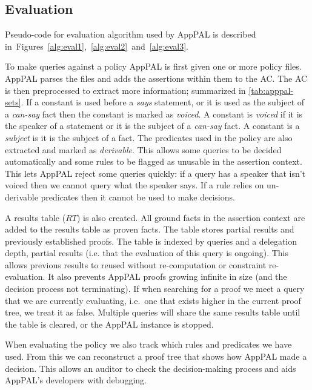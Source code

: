 \documentclass[thesis.tex]{subfiles}
\begin{document}
\subsection{Evaluation}
\label{ssec:evaluation-alg}

Pseudo-code for evaluation algorithm used by AppPAL is described
in~Figures~\ref{alg:eval1},~\ref{alg:eval2}~and~\ref{alg:eval3}.

To make queries against a policy AppPAL is first given one or more policy files.
AppPAL parses the files and adds the assertions within them to the \ac{AC}. The
AC is then preprocessed to extract more information; summarized in
\autoref{tab:apppal-sets}. If a constant is used before a \emph{says} statement,
or it is used as the subject of a \emph{can-say} fact then the constant is
marked as \emph{voiced}. A constant is \emph{voiced} if it is the speaker of a
statement or it is the subject of a \emph{can-say} fact. A constant is a
\emph{subject} is it is the subject of a fact. The predicates used in the policy
are also extracted and marked as \emph{derivable}. This allows some queries to
be decided automatically and some rules to be flagged as unusable in the
assertion context. This lets AppPAL reject some queries quickly: if a query has
a speaker that isn't voiced then we cannot query what the speaker says. If a
rule relies on un-derivable predicates then it cannot be used to make decisions.

A results table ($RT$) is also created. All ground facts in the assertion context are
added to the results table as proven facts. The table stores partial results and
previously established proofs. The table is indexed by queries and a delegation
depth, partial results (i.e. that the evaluation of this query is ongoing). This
allows previous results to reused without re-computation or constraint
re-evaluation. It also prevents AppPAL proofs growing infinite in size (and the
decision process not terminating). If when searching for a proof we meet a query
that we are currently evaluating, i.e.~one that exists higher in the current
proof tree, we treat it as false. Multiple queries will share the same results
table until the table is cleared, or the AppPAL instance is stopped.

When evaluating the policy we also track which rules and predicates we have
used. From this we can reconstruct a proof tree that shows how AppPAL made a
decision. This allows an auditor to check the decision-making process and aids
AppPAL's developers with debugging.
\end{document}
